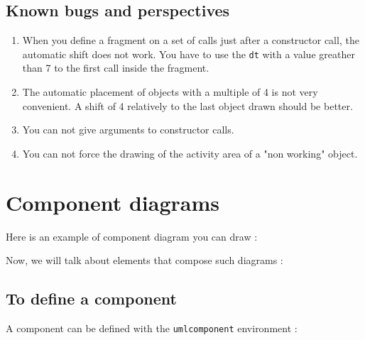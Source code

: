 \documentclass[a4paper,11pt]{report}
\newcommand{\inputTikZ}[1]{%
  }%
\newcommand{\inputTikZ}[1]{%
    \texttt{[image: fig/\#1.pdf]}%
  }%
\begin{document}
\begin{center}
\inputTikZ{seqdiagstep4}
\end{center}

\section{Known bugs and perspectives}\label{s.seqbug}

\begin{enumerate}
\item When you define a fragment on a set of calls just after a constructor call, the automatic shift does not work. You have to use the {\tt dt} with a value greather than 7 to the first call inside the fragment.
\item The automatic placement of objects with a multiple of 4 is not very convenient. A shift of 4 relatively to the last object drawn should be better.
\item You can not give arguments to constructor calls.
\item You can not force the drawing of the activity area of a "non working" object.

\begin{center}
\inputTikZ{bugcall}
\end{center}

\end{enumerate}

\chapter{Component diagrams}

Here is an example of component diagram you can draw :

\begin{center}
\inputTikZ{compdiagex}
\end{center}

Now, we will talk about elements that compose such diagrams :

\section{To define a component}


A component can be defined with the {\tt umlcomponent} environment :  

\medskip

\begin{minipage}{0.51\textwidth}

\end{minipage}
\begin{minipage}{0.49\textwidth}
\begin{center}
\inputTikZ{component}
\end{center}
\end{minipage}
\end{document}
